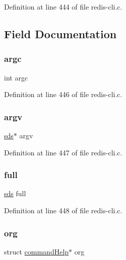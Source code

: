Definition at line 444 of file redis-\/cli.\+c.



\subsection{Field Documentation}
\mbox{\label{structhelp_entry_ad1447518f4372828b8435ae82e48499e}} 
\subsubsection{\texorpdfstring{argc}{argc}}
{\footnotesize\ttfamily int argc}



Definition at line 446 of file redis-\/cli.\+c.

\mbox{\label{structhelp_entry_aa7def7b53e4d59718c7aec9c35c75caa}} 
\subsubsection{\texorpdfstring{argv}{argv}}
{\footnotesize\ttfamily \hyperlink{sds_8h_ad69abac3df4532879db9642c95f5ef6f}{sds}$\ast$ argv}



Definition at line 447 of file redis-\/cli.\+c.

\mbox{\label{structhelp_entry_a68871af4f9c205cb2904958ceafed1dc}} 
\subsubsection{\texorpdfstring{full}{full}}
{\footnotesize\ttfamily \hyperlink{sds_8h_ad69abac3df4532879db9642c95f5ef6f}{sds} full}



Definition at line 448 of file redis-\/cli.\+c.

\mbox{\label{structhelp_entry_a6642ac5df30685d86cd11a44a22f6c21}} 
\subsubsection{\texorpdfstring{org}{org}}
{\footnotesize\ttfamily struct \hyperlink{structcommand_help}{command\+Help}$\ast$ org}



